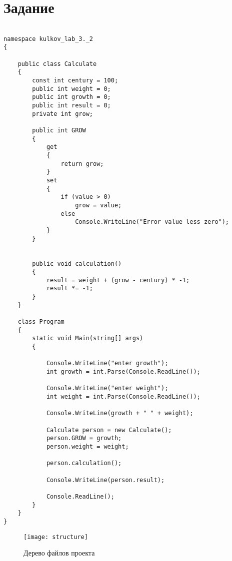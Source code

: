 \section*{Задание}



{
\verbatimFont
\begin{verbatim}

namespace kulkov_lab_3._2
{

    public class Calculate
    {
        const int century = 100;
        public int weight = 0;
        public int growth = 0;
        public int result = 0;
        private int grow;

        public int GROW
        {
            get
            {
                return grow;
            }
            set
            {
                if (value > 0)
                    grow = value;
                else
                    Console.WriteLine("Error value less zero");
            }
        }


        public void calculation()
        {
            result = weight + (grow - century) * -1;
            result *= -1;
        }
    }

    class Program
    {
        static void Main(string[] args)
        {

            Console.WriteLine("enter growth");
            int growth = int.Parse(Console.ReadLine());

            Console.WriteLine("enter weight");
            int weight = int.Parse(Console.ReadLine());

            Console.WriteLine(growth + " " + weight);

            Calculate person = new Calculate();
            person.GROW = growth;
            person.weight = weight;

            person.calculation();

            Console.WriteLine(person.result);

            Console.ReadLine();
        }
    }
}
\end{verbatim}}


\newpage


\begin{figure}[h]
\centering
\texttt{[image: structure]}
\caption{Дерево файлов проекта}
\label{fig:structure}
\end{figure}

